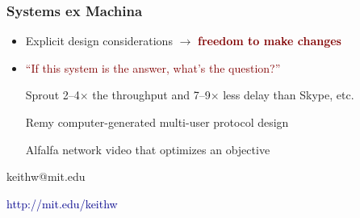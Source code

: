 \documentclass[svgnames]{beamer}
\begin{document}
\begin{frame}

\frametitle{Systems ex Machina}

\begin{itemize}

\item Explicit design considerations $\rightarrow$ \textbf{\textcolor{Maroon}{freedom to make changes}}

\item \textcolor{Maroon}{``If this system is the answer, what's the question?''}

\item[]

\item[Sprout] 2--4$\times$ the throughput and 7--9$\times$ less delay than Skype, etc.

\item[Remy] computer-generated multi-user protocol design


\item[Alfalfa] network video that optimizes an objective

\end{itemize}

\vspace{\baselineskip}

\begin{centering}
keithw@mit.edu

\vspace{7 pt}

\textcolor{DarkBlue}{http://mit.edu/keithw}

\end{centering}

\end{frame}
\end{document}
